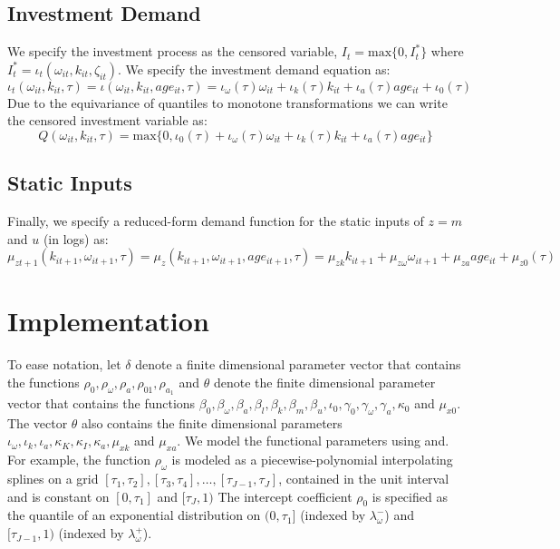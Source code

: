 \documentclass{article}
\begin{document}
\subsection{Investment Demand}
We specify the investment process as the censored variable, $I_{t}=\text{max}\{0, I^{*}_{t}\}$ where $I_{t}^{*}=\iota_{t}(\omega_{it}, k_{it}, \zeta_{it})$. We specify the investment demand equation as:
\begin{equation}\label{imodel}
\iota_{t}(\omega_{it}, k_{it}, \tau)=\iota(\omega_{it}, k_{it}, age_{it}, \tau)=\iota_{\omega}(\tau)\omega_{it}+\iota_{k}(\tau)k_{it}+\iota_{a}(\tau)age_{it}+\iota_{0}(\tau)
\end{equation}
Due to the equivariance of quantiles to monotone transformations we can write the censored investment variable as:
\begin{equation}\label{censormodel}
Q(\omega_{it}, k_{it}, \tau)=\text{max}\{0, \iota_{0}(\tau)+\iota_{\omega}(\tau)\omega_{it}+\iota_{k}(\tau)k_{it}+\iota_{a}(\tau)age_{it}\}
\end{equation}

\subsection{Static Inputs}
Finally, we specify a reduced-form demand function for the static inputs of $z=m$ and $u$ (in logs) as:
\begin{equation}\label{staticmodel}
\mu_{zt+1}(k_{it+1}, \omega_{it+1}, \tau)=\mu_{z}(k_{it+1}, \omega_{it+1}, age_{it+1}, \tau)=\mu_{zk}k_{it+1}+\mu_{z\omega}\omega_{it+1}+\mu_{za}age_{it}+\mu_{z0}(\tau)
\end{equation}

\section{Implementation}
To ease notation, let $\delta$ denote a finite dimensional parameter vector that contains the functions $\rho_{0},\rho_{\omega}, \rho_{a}, \rho_{01}, \rho_{a_{1}}$ and $\theta$ denote the finite dimensional parameter vector that contains the functions $\beta_{0}, \beta_{\omega}, \beta_{a}, \beta_{l}, \beta_{k}, \beta_{m}, \beta_{u}, \iota_{0}, \gamma_{0}, \gamma_{\omega}, \gamma_{a}, \kappa_{0}$ and $\mu_{x0}$. The vector $\theta$ also contains the finite dimensional parameters $\iota_{\omega}, \iota_{k}, \iota_{a}, \kappa_{K}, \kappa_{I}, \kappa_{a}, \mu_{xk}$ and $\mu_{xa}$. We model the functional parameters using \cite{Wei2009} and\cite{Arellano2016}. For example, the function $\rho_{\omega}$ is modeled as a piecewise-polynomial interpolating splines on a grid $[\tau_{1},\tau_{2}], [\tau_{3},\tau_{4}],\dots, [\tau_{J-1},\tau_{J}]$, contained in the unit interval and is constant on $[0, \tau_{1}]$ and $[\tau_{J}, 1)$ The intercept coefficient $\rho_{0}$ is specified as the quantile of an exponential distribution on $(0,\tau_{1}]$ (indexed by $\lambda_{\omega}^{-}$) and $[\tau_{J-1}, 1)$ (indexed by $\lambda_{\omega}^{+}$).\\
\end{document}
